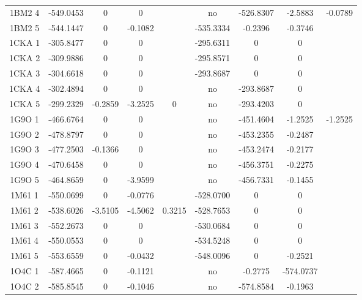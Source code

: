 \documentclass[a4paper,12pt]{article}
\begin{document}
\begin{table}[h]
\begin{tabular}{|c|c|c|c|c|c|c|c|c|}
        1BM2 4 & -549.0453 & 0 & 0 & &                        no & -526.8307 & -2.5883 & -0.0789 \\   
        1BM2 5 & -544.1447 & 0 & -0.1082 & &                  -535.3334 & -0.2396 & -0.3746 & \\      
        1CKA 1 & -305.8477 & 0 & 0 & &                        -295.6311 & 0 & 0 & \\                  
        1CKA 2 & -309.9886 & 0 & 0 & &                        -295.8571 & 0 & 0 & \\                  
        1CKA 3 & -304.6618 & 0 & 0 & &                        -293.8687 & 0 & 0 & \\                  
        1CKA 4 & -302.4894 & 0 & 0 & &                        no & -293.8687 & 0 & \\                 
        1CKA 5 & -299.2329 & -0.2859 & -3.2525 & 0 &          no & -293.4203 & 0 & \\                 
        1G9O 1 & -466.6764 & 0 & 0 & &                        no & -451.4604 & -1.2525 & -1.2525 \\   
        1G9O 2 & -478.8797 & 0 & 0 & &                        no & -453.2355 & -0.2487 & \\           
        1G9O 3 & -477.2503 & -0.1366 & 0 & &                  no & -453.2474 & -0.2177 & \\           
        1G9O 4 & -470.6458 & 0 & 0 & &                        no & -456.3751 & -0.2275 & \\           
        1G9O 5 & -464.8659 & 0 & -3.9599 & &                  no & -456.7331 & -0.1455 & \\           
        1M61 1 & -550.0699 & 0 & -0.0776 & &                  -528.0700 & 0 & 0 & \\                  
        1M61 2 & -538.6026 & -3.5105 & -4.5062 & 0.3215 &     -528.7653 & 0 & 0 & \\                  
        1M61 3 & -552.2673 & 0 & 0 & &                        -530.0684 & 0 & 0 & \\                  
        1M61 4 & -550.0553 & 0 & 0 & &                        -534.5248 & 0 & 0 & \\                  
        1M61 5 & -553.6559 & 0 & -0.0432 & &                  -548.0096 & 0 & -0.2521 & \\            
        1O4C 1 & -587.4665 & 0 & -0.1121 & &                  no & -0.2775 & -574.0737 & \\           
        1O4C 2 & -585.8545 & 0 & -0.1046 & &                  no & -574.8584 & -0.1963 & \\           

\end{tabular}
\end{table}
\end{document}
